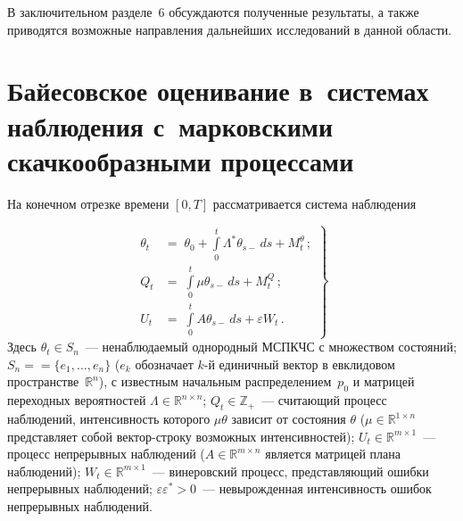 \begin{multicols}{2}
 В заключительном разделе~6 обсуждаются полученные результаты, а
 также приводятся возможные направления дальнейших исследований в
 данной области.
\vspace*{-3pt}

 \section{Байесовское оценивание в~системах наблюдения с~марковскими скачкообразными процессами}
\vspace*{-3pt}

 На конечном отрезке времени $[0,T]$ рассматривается система наблюдения
 
 \noindent
\begin{equation}
 \left.
 \begin{array}{rl}
 \displaystyle \theta_t\!\!\!&=\;\theta_0+\int\limits_0^t \Lambda^* \theta_{s-}\,ds +
 M^{\theta}_t\,; \\
 \displaystyle Q_t\!\!\!&=\;\int\limits_0^t \mu \theta_{s-}\,ds +
 M^{Q}_t\,; \\
 \displaystyle U_t\!\!\!&=\;\int\limits_0^t A \theta_{s-}\,ds + \varepsilon W_t\,.
 \end{array}
 \right\}
 \label{eq:markobsys}
\end{equation}
 Здесь
 $\theta_t \in S_n$~--- ненаблюдаемый однородный МСПКЧС с
 множеством состояний;
 $S_n=$\linebreak $=\{e_1,\ldots,e_n\}$ ($e_k$ обозначает $k$-й единичный вектор в евклидовом пространстве~$\mathbb{R}^n$),
 с известным начальным распределением~$p_0$ и матрицей пе\-реход\-ных вероятностей
 $\Lambda \in \mathbb{R}^{n \times n}$;
 $Q_t \in \mathbb{Z}_+$~--- счи\-та\-ющий процесс наблюдений,
 интенсивность кото\-ро\-го $\mu\theta$ зависит от состояния
$\theta$ ($\mu \in \mathbb{R}^{1 \times n}$
 представляет собой век\-тор-стро\-ку возможных интенсивностей);
 $U_t \in \mathbb{R}^{m \times 1}$~--- процесс непрерывных наблюдений ($A \in \mathbb{R}^{m \times n}$
 является матрицей плана наблюдений);
 $W_t \in \mathbb{R}^{m \times 1}$~--- винеровский процесс, пред\-став\-ля\-ющий ошибки непрерывных
 наблюдений;
 $\varepsilon \varepsilon^* > 0$~--- невырожденная интенсивность ошибок непрерывных наблюдений.


\end{multicols}
